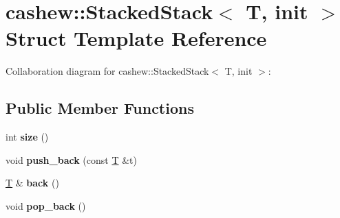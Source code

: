 \hypertarget{structcashew_1_1_stacked_stack}{}\section{cashew\+:\+:Stacked\+Stack$<$ T, init $>$ Struct Template Reference}
\label{structcashew_1_1_stacked_stack}


Collaboration diagram for cashew\+:\+:Stacked\+Stack$<$ T, init $>$\+:
\subsection*{Public Member Functions}
\begin{DoxyCompactItemize}
\item 
\mbox{\label{structcashew_1_1_stacked_stack_a40a707ac87c6079593ca4c6f82062465}} 
int {\bfseries size} ()
\item 
\mbox{\label{structcashew_1_1_stacked_stack_a770064b611c8af1f5ae0be49486232a9}} 
void {\bfseries push\+\_\+back} (const \mbox{\hyperlink{struct_t}{T}} \&t)
\item 
\mbox{\label{structcashew_1_1_stacked_stack_a4c429344bc5bea1d08288930a41da4cc}} 
\mbox{\hyperlink{struct_t}{T}} \& {\bfseries back} ()
\item 
\mbox{\label{structcashew_1_1_stacked_stack_af8d86f9745c676aba512fde59f007c5c}} 
void {\bfseries pop\+\_\+back} ()
\end{DoxyCompactItemize}
